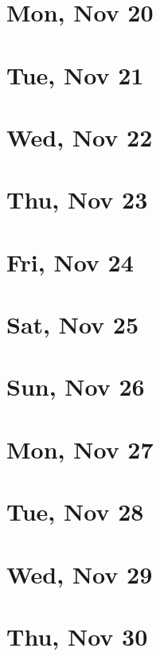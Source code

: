 	\section{Mon, Nov 20}
		
	\section{Tue, Nov 21}
		
	\section{Wed, Nov 22}
		
	\section{Thu, Nov 23}
		
	\section{Fri, Nov 24}
		
	\section{Sat, Nov 25}
		
	\section{Sun, Nov 26}
		
	\section{Mon, Nov 27}
		
	\section{Tue, Nov 28}
		
	\section{Wed, Nov 29}
		
	\section{Thu, Nov 30}
		
